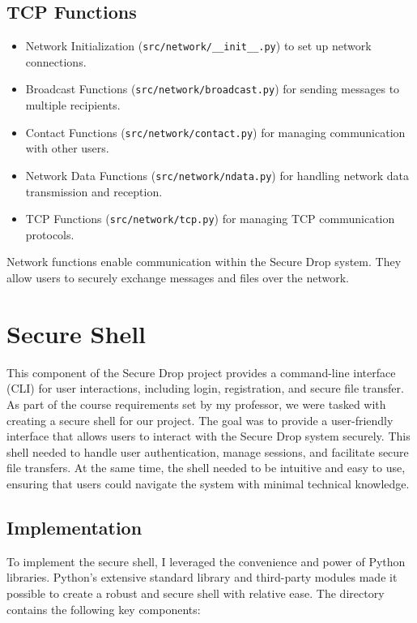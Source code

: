 \documentclass[12pt]{article}
\begin{document}
\subsection{TCP Functions}


\begin{itemize}
    \item Network Initialization (\texttt{src/network/\_\_init\_\_.py}) to set up network connections.
    \item Broadcast Functions (\texttt{src/network/broadcast.py}) for sending messages to multiple recipients.
    \item Contact Functions (\texttt{src/network/contact.py}) for managing communication with other users.
    \item Network Data Functions (\texttt{src/network/ndata.py}) for handling network data transmission and reception.
    \item TCP Functions (\texttt{src/network/tcp.py}) for managing TCP communication protocols.
\end{itemize}

Network functions enable communication within the Secure Drop system. They allow users to securely exchange messages and files over the network.

\newpage

\section{Secure Shell}
This component of the Secure Drop project provides a command-line interface (CLI) for user interactions, including login, registration, and secure file transfer.
As part of the course requirements set by my professor, we were tasked with creating a secure shell for our project. The goal was to provide a user-friendly interface that allows users to interact with the Secure Drop system securely. This shell needed to handle user authentication, manage sessions, and facilitate secure file transfers.
At the same time, the shell needed to be intuitive and easy to use, ensuring that users could navigate the system with minimal technical knowledge.

\subsection{Implementation}
To implement the secure shell, I leveraged the convenience and power of Python libraries. Python's extensive standard library and third-party modules made it possible to create a robust and secure shell with relative ease. The directory contains the following key components:
\end{document}
